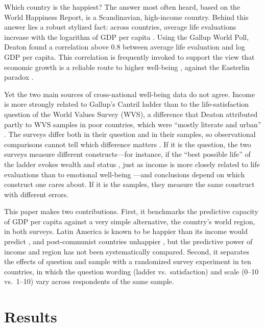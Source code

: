 \documentclass[10pt]{article}
\begin{document}
Which country is the happiest? The answer most often heard, based on the World Happiness Report, is a Scandinavian, high-income country. Behind this answer lies a robust stylized fact: across countries, average life evaluations increase with the logarithm of GDP per capita \citep{deaton_income_2008,stevenson_economic_2008,sacks_new_2012}. Using the Gallup World Poll, Deaton \citep{deaton_income_2008} found a correlation above 0.8 between average life evaluation and log GDP per capita. This correlation is frequently invoked to support the view that economic growth is a reliable route to higher well-being \citep{stevenson_economic_2008,jebb_happiness_2018}, against the Easterlin paradox \citep{easterlin_does_1974,easterlin_happiness_2010}.

Yet the two main sources of cross-national well-being data do not agree. Income is more strongly related to Gallup's Cantril ladder than to the life-satisfaction question of the World Values Survey (WVS), a difference that Deaton attributed partly to WVS samples in poor countries, which were ``mostly literate and urban'' \citep{deaton_income_2008}. The surveys differ both in their question and in their samples, so observational comparisons cannot tell which difference matters \citep{bjornskov_how_2010}. If it is the question, the two surveys measure different constructs---for instance, if the ``best possible life'' of the ladder evokes wealth and status \citep{nilsson_cantril_2024}, just as income is more closely related to life evaluations than to emotional well-being \citep{kahneman_high_2010}---and conclusions depend on which construct one cares about. If it is the samples, they measure the same construct with different errors.

This paper makes two contributions. First, it benchmarks the predictive capacity of GDP per capita against a very simple alternative, the country's world region, in both surveys. Latin America is known to be happier than its income would predict \citep{graham_paradox_2009,rojas_handbook_2016}, and post-communist countries unhappier \citep{guriev_unhappiness_2009}, but the predictive power of income and region has not been systematically compared. Second, it separates the effects of question and sample with a randomized survey experiment in ten countries, in which the question wording (ladder vs.\ satisfaction) and scale (0--10 vs.\ 1--10) vary across respondents of the same sample.

\section*{Results}
\end{document}
